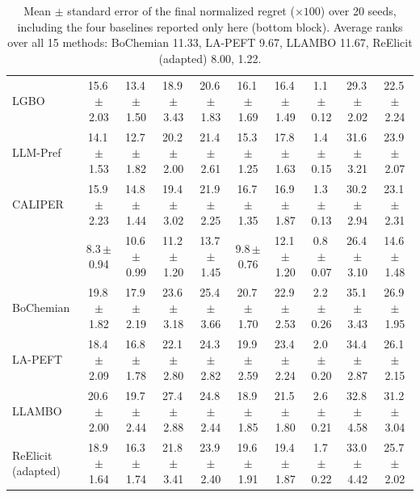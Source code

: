 \begin{table}[t]
\begin{tabular}{@{}l ccccccccc@{}}
LGBO & 15.6\,{\scriptsize$\pm$2.03} & 13.4\,{\scriptsize$\pm$1.50} & 18.9\,{\scriptsize$\pm$3.43} & 20.6\,{\scriptsize$\pm$1.83} & 16.1\,{\scriptsize$\pm$1.69} & 16.4\,{\scriptsize$\pm$1.49} & 1.1\,{\scriptsize$\pm$0.12} & 29.3\,{\scriptsize$\pm$2.02} & 22.5\,{\scriptsize$\pm$2.24} \\
LLM-Pref & 14.1\,{\scriptsize$\pm$1.53} & 12.7\,{\scriptsize$\pm$1.82} & 20.2\,{\scriptsize$\pm$2.00} & 21.4\,{\scriptsize$\pm$2.61} & 15.3\,{\scriptsize$\pm$1.25} & 17.8\,{\scriptsize$\pm$1.63} & 1.4\,{\scriptsize$\pm$0.15} & 31.6\,{\scriptsize$\pm$3.21} & 23.9\,{\scriptsize$\pm$2.07} \\
CALIPER & 15.9\,{\scriptsize$\pm$2.23} & 14.8\,{\scriptsize$\pm$1.44} & 19.4\,{\scriptsize$\pm$3.02} & 21.9\,{\scriptsize$\pm$2.25} & 16.7\,{\scriptsize$\pm$1.35} & 16.9\,{\scriptsize$\pm$1.87} & 1.3\,{\scriptsize$\pm$0.13} & 30.2\,{\scriptsize$\pm$2.94} & 23.1\,{\scriptsize$\pm$2.31} \\
\ours{} & 8.3\,{\scriptsize$\pm$0.94} & 10.6\,{\scriptsize$\pm$0.99} & 11.2\,{\scriptsize$\pm$1.20} & 13.7\,{\scriptsize$\pm$1.45} & 9.8\,{\scriptsize$\pm$0.76} & 12.1\,{\scriptsize$\pm$1.20} & 0.8\,{\scriptsize$\pm$0.07} & 26.4\,{\scriptsize$\pm$3.10} & 14.6\,{\scriptsize$\pm$1.48} \\
\midrule
BoChemian & 19.8\,{\scriptsize$\pm$1.82} & 17.9\,{\scriptsize$\pm$2.19} & 23.6\,{\scriptsize$\pm$3.18} & 25.4\,{\scriptsize$\pm$3.66} & 20.7\,{\scriptsize$\pm$1.70} & 22.9\,{\scriptsize$\pm$2.53} & 2.2\,{\scriptsize$\pm$0.26} & 35.1\,{\scriptsize$\pm$3.43} & 26.9\,{\scriptsize$\pm$1.95} \\
LA-PEFT & 18.4\,{\scriptsize$\pm$2.09} & 16.8\,{\scriptsize$\pm$1.78} & 22.1\,{\scriptsize$\pm$2.80} & 24.3\,{\scriptsize$\pm$2.82} & 19.9\,{\scriptsize$\pm$2.59} & 23.4\,{\scriptsize$\pm$2.24} & 2.0\,{\scriptsize$\pm$0.20} & 34.4\,{\scriptsize$\pm$2.87} & 26.1\,{\scriptsize$\pm$2.15} \\
LLAMBO & 20.6\,{\scriptsize$\pm$2.00} & 19.7\,{\scriptsize$\pm$2.44} & 27.4\,{\scriptsize$\pm$2.88} & 24.8\,{\scriptsize$\pm$2.44} & 18.9\,{\scriptsize$\pm$1.85} & 21.5\,{\scriptsize$\pm$1.80} & 2.6\,{\scriptsize$\pm$0.21} & 32.8\,{\scriptsize$\pm$4.58} & 31.2\,{\scriptsize$\pm$3.04} \\
ReElicit (adapted) & 18.9\,{\scriptsize$\pm$1.64} & 16.3\,{\scriptsize$\pm$1.74} & 21.8\,{\scriptsize$\pm$3.41} & 23.9\,{\scriptsize$\pm$2.40} & 19.6\,{\scriptsize$\pm$1.91} & 19.4\,{\scriptsize$\pm$1.87} & 1.7\,{\scriptsize$\pm$0.22} & 33.0\,{\scriptsize$\pm$4.42} & 25.7\,{\scriptsize$\pm$2.02} \\
\bottomrule
\end{tabular}
\caption{Mean $\pm$ standard error of the final normalized regret ($\times 100$) over 20 seeds, including the four baselines reported only here (bottom block). Average ranks over all 15 methods: BoChemian 11.33, LA-PEFT 9.67, LLAMBO 11.67, ReElicit (adapted) 8.00, \ours{} 1.22.}
\label{tab:se}
\end{table}
